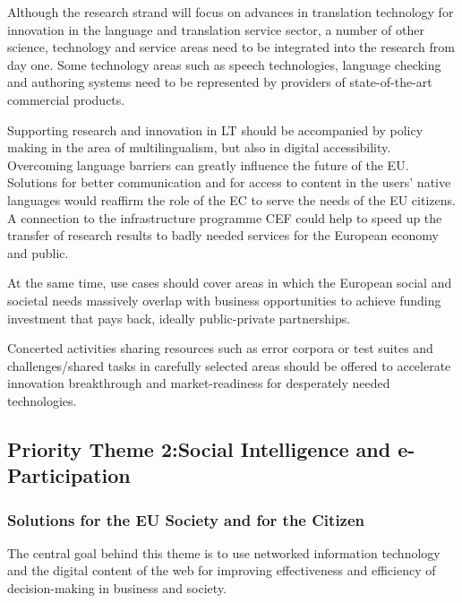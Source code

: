 \documentclass[10pt, plain]{../../metanetpaper}
\begin{document}
\begin{multicols}{2}
Although the research strand will focus on advances in translation technology for innovation in the language and translation service sector, a number of other science, technology and service areas need to be integrated into the research from day one. Some technology areas such as speech technologies, language checking and authoring systems need to be represented by providers of state-of-the-art commercial products.
 
Supporting research and innovation in LT should be accompanied by policy making in the area of multilingualism, but also in digital accessibility. Overcoming language barriers can greatly influence the future of the EU. Solutions for better communication and for access to content in the users' native languages would reaffirm the role of the EC to serve the needs of the EU citizens. A connection to the infrastructure programme CEF could help to speed up the transfer of research results to badly needed services for the European economy and public.

At the same time, use cases should cover areas in which the European social and societal needs massively overlap with business opportunities to achieve funding investment that pays back, ideally public-private partnerships.
 
Concerted activities sharing resources such as error corpora or test suites and challenges/shared tasks in carefully selected areas should be offered to accelerate innovation breakthrough and market-readiness for desperately needed technologies.

\subsection[Priority Theme 2: Social Intelligence and e-Participation]{Priority Theme 2:\newline Social Intelligence and e-Participation}
\label{sec:priority-theme-2-social-intelligence}

\subsubsection{Solutions for the EU Society and for the Citizen}
\label{sec:solutions-eu-society-pt2}

The central goal behind this theme is to use networked information technology and the digital content of the web for improving effectiveness and efficiency of decision-making in business and society. 
 

\end{multicols}
\end{document}

